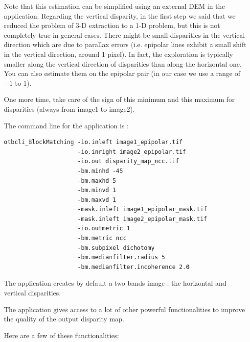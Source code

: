 Note that this estimation can be simplified using an external DEM in the
 application. Regarding the
vertical disparity, in the first step we said that we reduced the
problem of 3-D extraction to a 1-D problem, but this is not completely
true in general cases. There might be small disparities in the
vertical direction which are due to parallax errors (i.e. epipolar
lines exhibit a small shift in the vertical direction, around 1
pixel). In fact, the exploration is typically smaller along the
vertical direction of disparities than along the horizontal one. You
can also estimate them on the epipolar pair (in our case we use a
range of $-1$ to $1$).

One more time, take care of the sign of this minimum and this maximum for
disparities (always from image1 to image2).

The command line for the  application is :
\begin{verbatim}
otbcli_BlockMatching -io.inleft image1_epipolar.tif
                     -io.inright image2_epipolar.tif
                     -io.out disparity_map_ncc.tif
                     -bm.minhd -45
                     -bm.maxhd 5
                     -bm.minvd 1
                     -bm.maxvd 1
                     -mask.inleft image1_epipolar_mask.tif
                     -mask.inleft image2_epipolar_mask.tif
                     -io.outmetric 1
                     -bm.metric ncc
                     -bm.subpixel dichotomy
                     -bm.medianfilter.radius 5
                     -bm.medianfilter.incoherence 2.0
\end{verbatim}

The application creates by default a two bands image : the horizontal and
vertical disparities.

The  application gives access to a lot of other
powerful functionalities to improve the quality of the output disparity map.

Here are a few of these functionalities:

